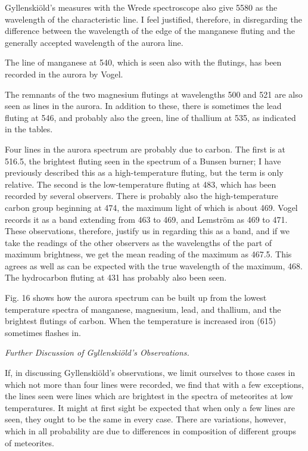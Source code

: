 \documentclass[a4paper, 12pt, oneside, polutonikogreek, english]{article}
\begin{document}
 Gyllenskiöld's measures with the Wrede spectroscope also give 5580 as the wavelength of the characteristic line. I feel justified, therefore, in disregarding the difference between the wavelength of the edge of the manganese fluting and the generally accepted wavelength of the aurora line.

The line of manganese at 540, which is seen also with the flutings, has been recorded in the aurora by Vogel.

The remnants of the two magnesium flutings at wavelengths 500 and 521 are also seen as lines in the aurora. In addition to these, there is sometimes the lead fluting at 546, and probably also the green, line of thallium at 535, as indicated in the tables.

Four lines in the aurora spectrum are probably due to carbon. The first is at 516.5, the brightest fluting seen in the spectrum of a Bunsen burner; I have previously described this as a high-temperature fluting, but the term is only relative. The second is the low-temperature fluting at 483, which has been recorded by several observers. There is probably also the high-temperature carbon group beginning at 474, the maximum light of which is about 469. Vogel records it as a band extending from 463 to 469, and Lemström as 469 to 471. These observations, therefore, justify us in regarding this as a band, and if we take the readings of the other observers as the wavelengths of the part of maximum brightness, we get the mean reading of the maximum as 467.5. This agrees as well as can be expected with the true wavelength of the maximum, 468. The hydrocarbon fluting at 431 has probably also been seen.

Fig. 16 shows how the aurora spectrum can be built up from the lowest temperature spectra of manganese, magnesium, lead, and thallium, and the brightest flutings of carbon. When the temperature is increased iron (615) sometimes flashes in.

\emph{Further Discussion of Gyllenskiöld's Observations.}

If, in discussing Gyllenskiöld's observations, we limit ourselves to those cases in which not more than four lines were recorded, we find that with a few exceptions, the lines seen were lines which are brightest in the spectra of meteorites at low temperatures. It might at first sight be expected that when only a few lines are seen, they ought to be the same in every case. There are variations, however, which in all probability are due to differences in composition of different groups of meteorites.
\end{document}
